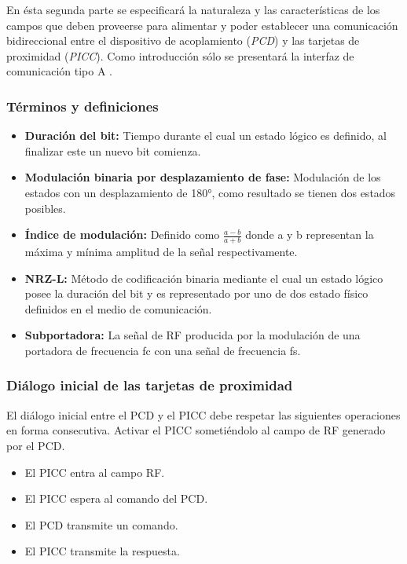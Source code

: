 En ésta segunda parte se especificará la naturaleza y las características de los campos que deben proveerse para alimentar y poder establecer una comunicación bidireccional entre el dispositivo de acoplamiento (\textit{PCD}) y las tarjetas de proximidad (\textit{PICC}). Como introducción sólo se presentará la interfaz de comunicación tipo A \cite{nfc_spec}.

\subsubsection{Términos y definiciones} 
\begin{itemize}
\item \textbf{Duración del bit:} Tiempo durante el cual un estado lógico es definido, al finalizar este un nuevo bit comienza.
\item \textbf{Modulación binaria por desplazamiento de fase:} Modulación de los estados con un desplazamiento de 180°, como resultado se tienen dos estados posibles.
\item \textbf{Índice de modulación:} Definido como $\frac{a-b}{a+b}$ donde a y b representan la máxima y mínima amplitud de la señal respectivamente.
\item \textbf{NRZ-L:} Método de codificación binaria mediante el cual un estado lógico posee la duración del bit y es representado por uno de dos estado físico definidos en el medio de comunicación.
\item \textbf{Subportadora:} La señal de RF producida por la modulación de una portadora de frecuencia fc con una señal de frecuencia fs.
\end{itemize}

\subsubsection{Diálogo inicial de las tarjetas de proximidad}

El diálogo inicial entre el PCD y el PICC debe respetar las siguientes operaciones en forma consecutiva.
Activar el PICC sometiéndolo al campo de RF generado por el PCD.
\begin{itemize}
\item El PICC entra al campo RF.
\item El PICC espera al comando del PCD.
\item El PCD transmite un comando.
\item El PICC transmite la respuesta.
\end{itemize}

